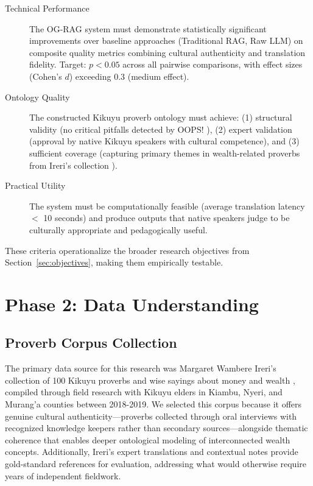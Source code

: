 \begin{description}
    \item[Technical Performance] The OG-RAG system must demonstrate statistically significant improvements over baseline approaches (Traditional RAG, Raw LLM) on composite quality metrics combining cultural authenticity and translation fidelity. Target: $p < 0.05$ across all pairwise comparisons, with effect sizes (Cohen's $d$) exceeding 0.3 (medium effect).
    
    \item[Ontology Quality] The constructed Kikuyu proverb ontology must achieve: (1) structural validity (no critical pitfalls detected by OOPS! \cite{poveda2014oops}), (2) expert validation (approval by native Kikuyu speakers with cultural competence), and (3) sufficient coverage (capturing primary themes in wealth-related proverbs from Ireri's collection \cite{ireri2019proverbs}).
    
    \item[Practical Utility] The system must be computationally feasible (average translation latency $<$ 10 seconds) and produce outputs that native speakers judge to be culturally appropriate and pedagogically useful.
\end{description}

These criteria operationalize the broader research objectives from Section~\ref{sec:objectives}, making them empirically testable.

\section{Phase 2: Data Understanding}
\label{sec:phase_data_understanding}

\subsection{Proverb Corpus Collection}
\label{subsec:corpus_collection}

The primary data source for this research was Margaret Wambere Ireri's collection of 100 Kikuyu proverbs and wise sayings about money and wealth \cite{ireri2019proverbs}, compiled through field research with Kikuyu elders in Kiambu, Nyeri, and Murang'a counties between 2018-2019. We selected this corpus because it offers genuine cultural authenticity—proverbs collected through oral interviews with recognized knowledge keepers rather than secondary sources—alongside thematic coherence that enables deeper ontological modeling of interconnected wealth concepts. Additionally, Ireri's expert translations and contextual notes provide gold-standard references for evaluation, addressing what would otherwise require years of independent fieldwork.

